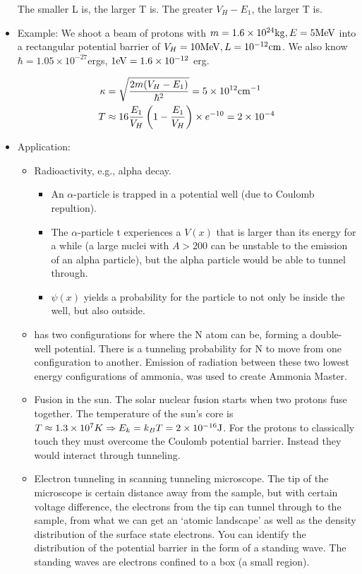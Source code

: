\documentclass{school-22.101-notes}
\begin{document}
\begin{itemize}
The smaller L is, the larger T is. The greater $V_H - E_1$, the larger T is. 


\item Example: We shoot a beam of protons with $m = 1.6 \times 10^{24} \mathrm{kg}, E = 5 \mathrm{MeV}$ into a rectangular potential barrier of $V_H = 10 \mathrm{MeV}, L = 10^{-12} \mathrm{cm}$. We also know $\hbar = 1.05 \times 10^{-27} $ergs, $1\mathrm{eV} = 1.6 \times 10^{-12}$ erg.

\begin{align}
\kappa &= \sqrt{\frac{2 m (V_H - E_1)}{\hbar^2}} = 5 \times 10^{12} \mathrm{cm}^{-1} \\
T &\approx 16 \frac{E_1}{V_H} \left( 1 - \frac{E_1}{V_H} \right) \times e^{-10} = 2 \times 10^{-4} \\
\end{align}

\item Application: 
\begin{itemize}
\item Radioactivity, e.g., alpha decay. 
  \begin{itemize}
  \item An $\alpha$-particle is trapped in a potential well (due to Coulomb repultion). 
  \item The $\alpha$-particle t experiences a $V(x)$ that is larger than its energy for a while (a large nuclei with $A > 200$ can be unstable to the emission of an alpha particle), but the alpha particle would be able to tunnel through. 
  \item $\psi(x)$ yields a probability for the particle to not only be inside the well, but also outside. 
\end{itemize}

\item {} has two configurations for where the N atom can be, forming a double-well potential. There is a tunneling probability for N to move from one configuration to another. Emission of radiation between these two lowest energy configurations of ammonia, was used to create Ammonia Master. 

\item Fusion in the sun. The solar nuclear fusion starts when two protons fuse together. The temperature of the sun's core is $T \approx 1.3 \times 10^7 K \Rightarrow E_k = k_B T = 2 \times 10^{-16} \mathrm{J}$. For the protons to classically touch they must overcome the Coulomb potential barrier. Instead they would interact through tunneling.  

\item Electron tunneling in scanning tunneling microscope. The tip of the microscope is certain distance away from the sample, but with certain voltage difference, the electrons from the tip can tunnel through to the sample, from what we can get an `atomic landscape' as well as the density distribution of the surface state electrons. You can identify the distribution of the potential barrier in the form of a standing wave. The standing waves are electrons confined to a box (a small region). 
\end{itemize}


\end{itemize}
\end{document}
